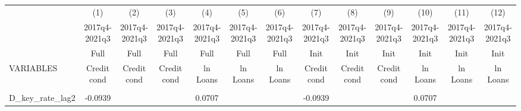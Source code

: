 \documentclass[]{article}
\begin{document}
\begin{center}
\begin{tabular}{lcccccccccccc} \hline
 & (1) & (2) & (3) & (4) & (5) & (6) & (7) & (8) & (9) & (10) & (11) & (12) \\
 & 2017q4-2021q3 & 2017q4-2021q3 & 2017q4-2021q3 & 2017q4-2021q3 & 2017q4-2021q3 & 2017q4-2021q3 & 2017q4-2021q3 & 2017q4-2021q3 & 2017q4-2021q3 & 2017q4-2021q3 & 2017q4-2021q3 & 2017q4-2021q3 \\
 & Full & Full & Full & Full & Full & Full & Init & Init & Init & Init & Init & Init \\
VARIABLES & Credit cond & Credit cond & Credit cond & ln Loans & ln Loans & ln Loans & Credit cond & Credit cond & Credit cond & ln Loans & ln Loans & ln Loans \\ \hline
\vspace{4pt} & \begin{footnotesize}\end{footnotesize} & \begin{footnotesize}\end{footnotesize} & \begin{footnotesize}\end{footnotesize} & \begin{footnotesize}\end{footnotesize} & \begin{footnotesize}\end{footnotesize} & \begin{footnotesize}\end{footnotesize} & \begin{footnotesize}\end{footnotesize} & \begin{footnotesize}\end{footnotesize} & \begin{footnotesize}\end{footnotesize} & \begin{footnotesize}\end{footnotesize} & \begin{footnotesize}\end{footnotesize} & \begin{footnotesize}\end{footnotesize} \\
D\_key\_rate\_lag2 & -0.0939 &  &  & 0.0707 &  &  & -0.0939 &  &  & 0.0707 &  &  \\

\end{tabular}
\end{center}
\end{document}
